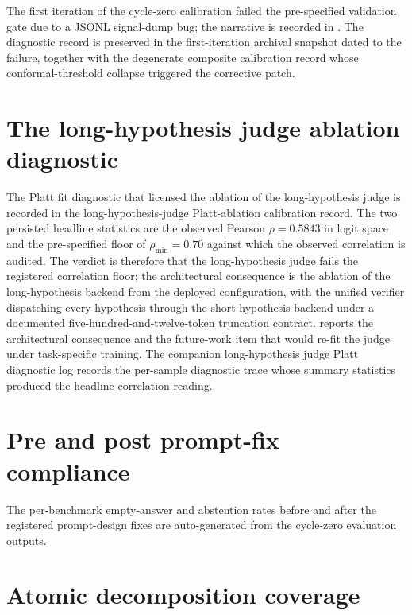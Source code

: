 The first iteration of the cycle-zero calibration failed the pre-specified validation gate due to a JSONL signal-dump bug; the narrative is recorded in . The diagnostic record is preserved in the first-iteration archival snapshot dated to the failure, together with the degenerate composite calibration record whose conformal-threshold collapse triggered the corrective patch.

\section{The long-hypothesis judge ablation diagnostic}
\label{app:judge-ablation}

The Platt fit diagnostic that licensed the ablation of the long-hypothesis judge is recorded in the long-hypothesis-judge Platt-ablation calibration record. The two persisted headline statistics are the observed Pearson $\rho = 0.5843$ in logit space and the pre-specified floor of $\rho_{\min} = 0.70$ against which the observed correlation is audited. The verdict is therefore that the long-hypothesis judge fails the registered correlation floor; the architectural consequence is the ablation of the long-hypothesis backend from the deployed configuration, with the unified verifier dispatching every hypothesis through the short-hypothesis backend under a documented five-hundred-and-twelve-token truncation contract.  reports the architectural consequence and the future-work item that would re-fit the judge under task-specific training. The companion long-hypothesis judge Platt diagnostic log records the per-sample diagnostic trace whose summary statistics produced the headline correlation reading.

\section{Pre and post prompt-fix compliance}
\label{app:prompt-compliance}

The per-benchmark empty-answer and abstention rates before and after the registered prompt-design fixes are auto-generated from the cycle-zero evaluation outputs.



\section{Atomic decomposition coverage}
\label{app:atomic-coverage}

